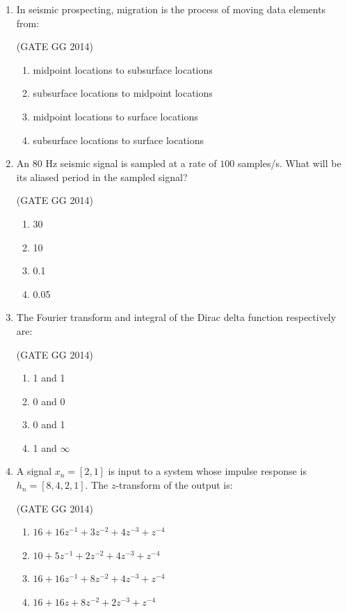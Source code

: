\documentclass[journal]{IEEEtran}
\begin{document}
\begin{enumerate}[start=26]
\item In seismic prospecting, migration is the process of moving data elements from:

\hfill(GATE GG 2014)
\begin{enumerate}
    \item midpoint locations to subsurface locations
    \item subsurface locations to midpoint locations
    \item midpoint locations to surface locations
    \item subsurface locations to surface locations
\end{enumerate}

\item An $80$ Hz seismic signal is sampled at a rate of $100$ samples/s. What will be its aliased period  in the sampled signal?

\hfill(GATE GG 2014)
\begin{multicols}{4}
    \begin{enumerate}
    \item 30
    \item 10
    \item 0.1
    \item 0.05
\end{enumerate}
\end{multicols}

\item The Fourier transform and integral of the Dirac delta function respectively are:

\hfill(GATE GG 2014)
\begin{multicols}{2}
   \begin{enumerate}
    \item 1 and 1
    \item 0 and 0
    \item 0 and 1
    \item 1 and $\infty$
\end{enumerate} 
\end{multicols}

\item A signal $x_n = [2, 1]$ is input to a system whose impulse response is $h_n = [8, 4, 2, 1]$.
The $z$-transform of the output is:

\hfill(GATE GG 2014)
\begin{enumerate}
    \item $16 + 16 z^{-1} + 3 z^{-2} + 4 z^{-3} + z^{-4}$
    \item $10 + 5 z^{-1} + 2 z^{-2} + 4 z^{-3} + z^{-4}$
    \item $16 + 16 z^{-1} + 8 z^{-2} + 4 z^{-3} + z^{-4}$
    \item $16 + 16 z + 8 z^{-2} + 2 z^{-3} + z^{-4}$
\end{enumerate}


\end{enumerate}
\end{document}
